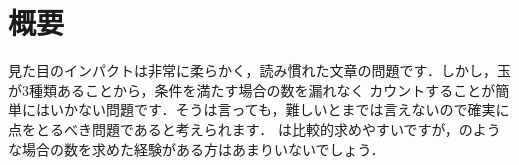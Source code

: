\documentclass[../../../doc/main]{subfiles}
\begin{document}
    \setcounter{chapter}{2}
    \setcounter{section}{0}
    \section{概要}\label{概要2}
        見た目のインパクトは非常に柔らかく，読み慣れた文章の問題です．しかし，玉が3種類あることから，条件を満たす場合の数を漏れなく
        カウントすることが簡単にはいかない問題です．そうは言っても，難しいとまでは言えないので確実に点をとるべき問題であると考えられます．\kakkoichi 
        は比較的求めやすいですが，\kakkoni のような場合の数を求めた経験がある方はあまりいないでしょう．
\end{document}
